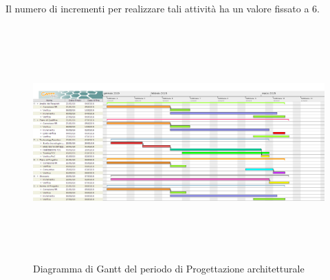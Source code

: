 Il numero di incrementi per realizzare tali attività ha un valore fissato a 6.

\begin{figure}[H]
	\centering
	\hspace*{-1.5cm}
		\includegraphics[width=19.4cm, height=9cm]{Pianificazione/Progettazione.png}
	\caption{Diagramma di Gantt del periodo di Progettazione architetturale}
\end{figure}